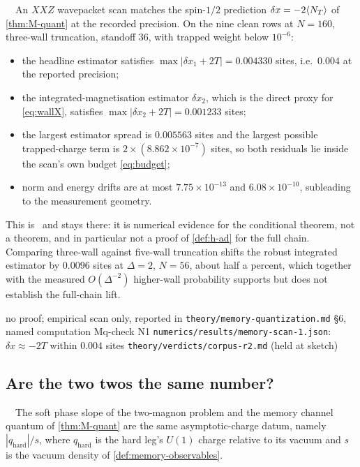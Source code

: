 \begin{observation}
\label{obs:N2}
\statusSketch\ \ An $XXZ$ wavepacket scan matches the spin-$1/2$ prediction
$\delta x=-2\langle N_T\rangle$ of \cref{thm:M-quant} at the recorded precision. On
the nine clean rows at $N=160$, three-wall truncation, standoff $36$, with
trapped weight below $10^{-6}$:
\begin{itemize}
\item the headline estimator satisfies $\max|\delta x_1+2T|=0.004330$ sites,
  i.e.\ $0.004$ at the reported precision;
\item the integrated-magnetisation estimator $\delta x_2$, which is the direct
  proxy for \eqref{eq:wallX}, satisfies $\max|\delta x_2+2T|=0.001233$ sites;
\item the largest estimator spread is $0.005563$ sites and the largest possible
  trapped-charge term is $2\times(8.862\times10^{-7})$ sites, so both residuals
  lie inside the scan's own budget \eqref{eq:budget};
\item norm and energy drifts are at most $7.75\times10^{-13}$ and
  $6.08\times10^{-10}$, subleading to the measurement geometry.
\end{itemize}
This is \statusSketch\ and stays there: it is numerical evidence for the
conditional theorem, not a theorem, and in particular not a proof of
\cref{def:h-ad} for the full chain. Comparing three-wall against five-wall
truncation shifts the robust integrated estimator by $0.0096$ sites at
$\Delta=2$, $N=56$, about half a percent, which together with the measured
$O(\Delta^{-2})$ higher-wall probability supports but does not establish the
full-chain lift.
\end{observation}

%
{no proof; empirical scan only, reported in
 \texttt{theory/memory-quantization.md} \S6, named computation Mq-check N1}%
{\texttt{numerics/results/memory-scan-1.json}: $\delta x\approx-2T$ within
 $0.004$ sites}%
{\texttt{theory/verdicts/corpus-r2.md} (held at sketch)}

\subsection{Are the two twos the same number?}

\begin{conjecture}
\label{conj:Bc}
\statusConjecture\ \ The soft phase slope of the two-magnon problem and the
memory channel quantum of \cref{thm:M-quant} are the same asymptotic-charge
datum, namely $|q_{\mathrm{hard}}|/s$, where $q_{\mathrm{hard}}$ is the hard
leg's $U(1)$ charge relative to its vacuum and $s$ is the vacuum density of
\cref{def:memory-observables}.
\end{conjecture}

